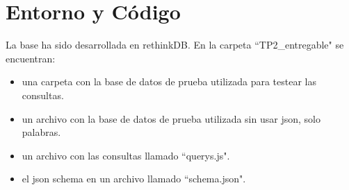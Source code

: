 \section{Entorno y Código}

La base ha sido desarrollada en rethinkDB. En la carpeta ``TP2_entregable" se encuentran:

\begin{itemize}
	\item una carpeta con la base de datos de prueba utilizada para testear las consultas.
	\item un archivo con la base de datos de prueba utilizada sin usar json, solo palabras.
	\item un archivo con las consultas llamado ``querys.js".	
	\item el json schema en un archivo llamado ``schema.json".
\end{itemize}